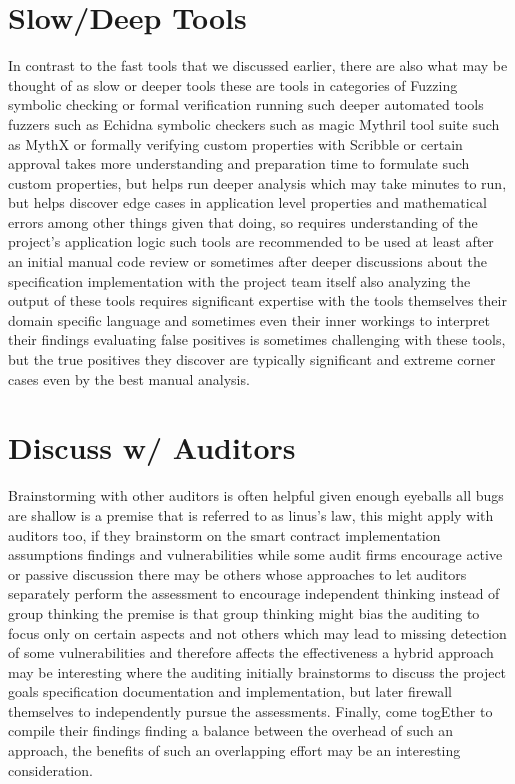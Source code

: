 \section{Slow/Deep Tools}

In contrast to the fast tools that we discussed earlier, there are also what may be thought of as slow or deeper tools these are tools in categories of Fuzzing symbolic checking or formal verification running such deeper automated tools fuzzers such as Echidna symbolic checkers such as magic Mythril tool suite such as MythX or formally verifying custom properties with Scribble or certain approval takes more understanding and preparation time to formulate such custom properties, but helps run deeper analysis which may take minutes to run, but helps discover edge cases in application level properties and mathematical errors among other things given that doing, so requires understanding of the project's application logic such tools are recommended to be used at least after an initial manual code review or sometimes after deeper discussions about the specification implementation with the project team itself also analyzing the output of these tools requires significant expertise with the tools themselves their domain specific language and sometimes even their inner workings to interpret their findings evaluating false positives is sometimes challenging with these tools, but the true positives they discover are typically significant and extreme corner cases even by the best manual analysis.

\section{Discuss w/ Auditors}

Brainstorming with other auditors is often helpful given enough eyeballs all bugs are shallow is a premise that is referred to as linus's law, this might apply with auditors too, if they brainstorm on the smart contract implementation assumptions findings and vulnerabilities while some audit firms encourage active or passive discussion there may be others whose approaches to let auditors separately perform the assessment to encourage independent thinking instead of group thinking the premise is that group thinking might bias the auditing to focus only on certain aspects and not others which may lead to missing detection of some vulnerabilities and therefore affects the effectiveness a hybrid approach may be interesting where the auditing initially brainstorms to discuss the project goals specification documentation and implementation, but later firewall themselves to independently pursue the assessments. Finally, come togEther to compile their findings finding a balance between the overhead of such an approach, the benefits of such an overlapping effort may be an interesting consideration.

